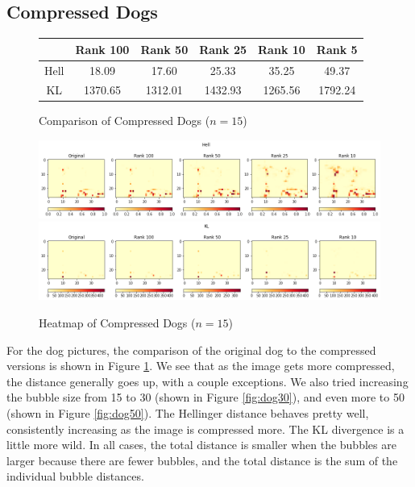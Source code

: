 \documentclass{article}
\begin{document}
\subsection{Compressed Dogs}

\begin{figure}[h!]
\begin{center}
\begin{tabular}{ c || c | c | c | c | c }
    & Rank 100 & Rank 50 & Rank 25 & Rank 10 & Rank 5 \\ \hline
    Hell & 18.09 & 17.60 & 25.33 & 35.25 & 49.37 \\
    KL & 1370.65 & 1312.01 & 1432.93 & 1265.56 & 1792.24
\end{tabular}
\caption{Comparison of Compressed Dogs ($n=15$)}
\label{fig:dog15}
\end{center}
\end{figure}

\begin{figure}[h!]
\begin{center}
\includegraphics[width=\textwidth]{hell-dogs-15.png}
\includegraphics[width=\textwidth]{kl-dogs-15.png}
\caption{Heatmap of Compressed Dogs ($n=15$)}
\label{fig:dogheat15}
\end{center}
\end{figure}

For the dog pictures, the comparison of the original dog to the compressed
versions is shown in Figure \ref{fig:dog15}. We see that as the image gets more
compressed, the distance generally goes up, with a couple exceptions. We also
tried increasing the bubble size from 15 to 30 (shown in Figure
\ref{fig:dog30}), and even more to 50 (shown in Figure \ref{fig:dog50}). The
Hellinger distance behaves pretty well, consistently increasing as the image is
compressed more. The KL divergence is a little more wild. In all cases, the
total distance is smaller when the bubbles are larger because there are fewer
bubbles, and the total distance is the sum of the individual bubble distances.
\end{document}

